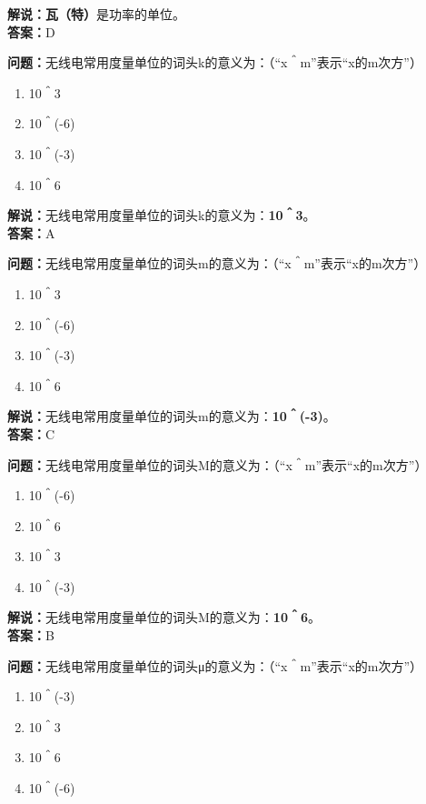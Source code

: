 \textbf{解说：瓦（特）}是功率的单位。\\\textbf{答案：}D



\textbf{问题：}无线电常用度量单位的词头k的意义为：（“x＾m”表示“x的m次方”）

\begin{enumerate}[label=\Alph*), leftmargin=1.5cm]
	\item 10＾3
	\item 10＾(-6)
	\item 10＾(-3)
	\item 10＾6
\end{enumerate}

\textbf{解说：}无线电常用度量单位的词头k的意义为：\textbf{10＾3}。\\\textbf{答案：}A



\textbf{问题：}无线电常用度量单位的词头m的意义为：（“x＾m”表示“x的m次方”）

\begin{enumerate}[label=\Alph*), leftmargin=1.5cm]
	\item 10＾3
	\item 10＾(-6)
	\item 10＾(-3)
	\item 10＾6
\end{enumerate}

\textbf{解说：}无线电常用度量单位的词头m的意义为：\textbf{10＾(-3)}。\\\textbf{答案：}C



\textbf{问题：}无线电常用度量单位的词头M的意义为：（“x＾m”表示“x的m次方”）

\begin{enumerate}[label=\Alph*), leftmargin=1.5cm]
	\item 10＾(-6)
	\item 10＾6
	\item 10＾3
	\item 10＾(-3)
\end{enumerate}

\textbf{解说：}无线电常用度量单位的词头M的意义为：\textbf{10＾6}。\\\textbf{答案：}B



\textbf{问题：}无线电常用度量单位的词头μ的意义为：（“x＾m”表示“x的m次方”）

\begin{enumerate}[label=\Alph*), leftmargin=1.5cm]
	\item 10＾(-3)
	\item 10＾3
	\item 10＾6
	\item 10＾(-6)
\end{enumerate}

